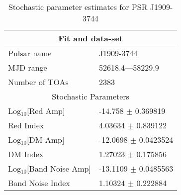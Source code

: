 \documentclass{article}
\begin{document}
\begin{table*}
\caption{Stochastic parameter estimates for PSR J1909-3744}
\begin{tabular}{ll}
\hline\hline
\multicolumn{2}{c}{Fit and data-set} \\ 
\hline
Pulsar name\dotfill & J1909-3744 \\ 
MJD range\dotfill & 52618.4---58229.9 \\ 
Number of TOAs\dotfill & 2383 \\
\hline
\multicolumn{2}{c}{Stochastic Parameters} \\ 
\hline
Log$_{10}$[Red Amp] \dotfill & -14.758 $\pm$ 0.369819  \\ 
Red Index \dotfill & 4.03634 $\pm$ 0.839122  \\ 
Log$_{10}$[DM Amp] \dotfill & -12.0698 $\pm$ 0.0423524  \\ 
DM Index \dotfill & 1.27023 $\pm$ 0.175856  \\ 
Log$_{10}$[Band Noise Amp] \dotfill & -13.1109 $\pm$ 0.0485563  \\ 
Band Noise Index \dotfill & 1.10324 $\pm$ 0.222884  \\ 
\hline
\end{tabular}
\label{Table:J1909-3744}
\end{table*} 
\end{document}
